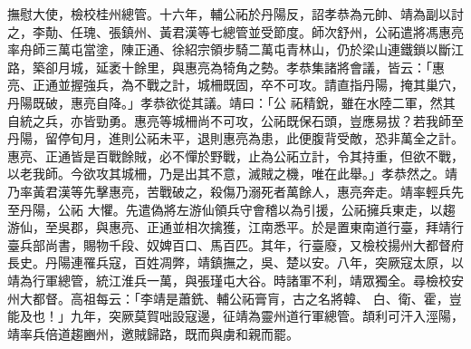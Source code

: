 \begin{pinyinscope}
 撫慰大使，檢校桂州總管。十六年，輔公祏於丹陽反，詔孝恭為元帥、靖為副以討之，李勣、任瑰、張鎮州、黃君漢等七總管並受節度。師次舒州，公祏遣將馮惠亮率舟師三萬屯當塗，陳正通、徐紹宗領步騎二萬屯青林山，仍於梁山連鐵鎖以斷江路，築卻月城，延袤十餘里，與惠亮為犄角之勢。孝恭集諸將會議，皆云：「惠亮、正通並握強兵，為不戰之計，城柵既固，卒不可攻。請直指丹陽，掩其巢穴，丹陽既破，惠亮自降。」孝恭欲從其議。靖曰：「公
 祏精銳，雖在水陸二軍，然其自統之兵，亦皆勁勇。惠亮等城柵尚不可攻，公祏既保石頭，豈應易拔？若我師至丹陽，留停旬月，進則公祏未平，退則惠亮為患，此便腹背受敵，恐非萬全之計。惠亮、正通皆是百戰餘賊，必不憚於野戰，止為公祏立計，令其持重，但欲不戰，以老我師。今欲攻其城柵，乃是出其不意，滅賊之機，唯在此舉。」孝恭然之。靖乃率黃君漢等先擊惠亮，苦戰破之，殺傷乃溺死者萬餘人，惠亮奔走。靖率輕兵先至丹陽，公祏
 大懼。先遣偽將左游仙領兵守會稽以為引援，公祏擁兵東走，以趨游仙，至吳郡，與惠亮、正通並相次擒獲，江南悉平。於是置東南道行臺，拜靖行臺兵部尚書，賜物千段、奴婢百口、馬百匹。其年，行臺廢，又檢校揚州大都督府長史。丹陽連罹兵寇，百姓凋弊，靖鎮撫之，吳、楚以安。八年，突厥寇太原，以靖為行軍總管，統江淮兵一萬，與張瑾屯大谷。時諸軍不利，靖眾獨全。尋檢校安州大都督。高祖每云：「李靖是蕭銑、輔公祏膏肓，古之名將韓、
 白、衛、霍，豈能及也！」九年，突厥莫賀咄設寇邊，征靖為靈州道行軍總管。頡利可汗入涇陽，靖率兵倍道趨豳州，邀賊歸路，既而與虜和親而罷。




\end{pinyinscope}
